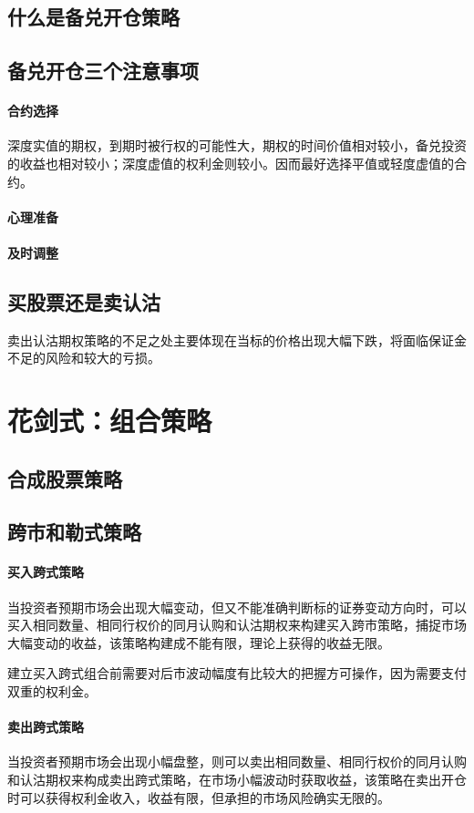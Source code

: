 \documentclass{article}
\begin{document}
\subsection{什么是备兑开仓策略}
\subsection{备兑开仓三个注意事项}
\paragraph{合约选择}
深度实值的期权，到期时被行权的可能性大，期权的时间价值相对较小，备兑投资的收益也相对较小；深度虚值的权利金则较小。因而最好选择平值或轻度虚值的合约。
\paragraph{心理准备}
\paragraph{及时调整}
\subsection{买股票还是卖认沽}
卖出认沽期权策略的不足之处主要体现在当标的价格出现大幅下跌，将面临保证金不足的风险和较大的亏损。
\section{花剑式：组合策略}
\subsection{合成股票策略}
\subsection{跨市和勒式策略}
\paragraph{买入跨式策略} 当投资者预期市场会出现大幅变动，但又不能准确判断标的证券变动方向时，可以买入相同数量、相同行权价的同月认购和认沽期权来构建买入跨市策略，捕捉市场大幅变动的收益，该策略构建成不能有限，理论上获得的收益无限。

建立买入跨式组合前需要对后市波动幅度有比较大的把握方可操作，因为需要支付双重的权利金。

\paragraph{卖出跨式策略} 当投资者预期市场会出现小幅盘整，则可以卖出相同数量、相同行权价的同月认购和认沽期权来构成卖出跨式策略，在市场小幅波动时获取收益，该策略在卖出开仓时可以获得权利金收入，收益有限，但承担的市场风险确实无限的。
\end{document}
